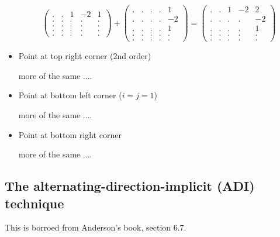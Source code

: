 \begin{itemize}
\[
\begin{pmatrix}
. & . &  1 & -2 & 1 \\
. & . &  . & . & . \\
. & . &  . & . & . \\
. & . &  . & . & . \\
. & . &  . & . & . 
\end{pmatrix}
+
\begin{pmatrix}
. & . &  . & . & 1 \\
. & . &  . & . & -2 \\
. & . &  . & . & 1 \\
. & . &  . & . & . \\
. & . &  . & . & . 
\end{pmatrix}
=
\begin{pmatrix}
. & . &  1 & -2 & 2 \\
. & . &  . & . & -2 \\
. & . &  . & . & 1 \\
. & . &  . & . & . \\
. & . &  . & . & . 
\end{pmatrix}
\]

\item Point at top right corner (2nd order)

more of the same ....

\item Point at bottom left corner ($i=j=1$)

more of the same ....

\item Point at bottom right corner

more of the same ....

\end{itemize}












\subsection{The alternating-direction-implicit (ADI) technique}

This is borroed from Anderson's book, section 6.7.

